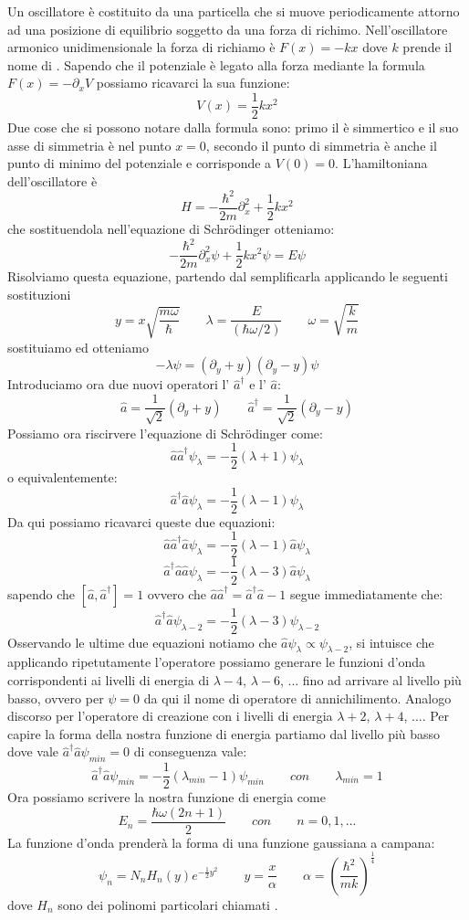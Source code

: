 Un oscillatore è costituito da una particella che si muove periodicamente attorno ad una posizione di equilibrio soggetto da una forza di richimo. Nell'oscillatore armonico unidimensionale la forza di richiamo è $F(x) = -kx$ dove $k$ prende il nome di . Sapendo che il potenziale è legato alla forza mediante la formula $F(x) = -\partial_x V$ possiamo ricavarci la sua funzione:
$$V(x) = \frac{1}{2}kx^2$$
Due cose che si possono notare dalla formula sono: primo il  è simmertico e il suo asse di simmetria è nel punto $x = 0$, secondo il punto di simmetria è anche il punto di minimo del potenziale e corrisponde a $V(0) = 0$.
L'hamiltoniana dell'oscillatore è
$$H = - \frac{\hbar^2}{2m} \partial_x^2 + \frac{1}{2}kx^2$$
che sostituendola nell'equazione di Schr\"odinger otteniamo:
$$- \frac{\hbar^2}{2m} \partial_x^2\psi + \frac{1}{2}kx^2\psi = E\psi$$
Risolviamo questa equazione, partendo dal semplificarla applicando le seguenti sostituzioni
$$y = x\sqrt{\frac{m\omega}{\hbar}} \qquad \lambda = \frac{E}{(\hbar \omega / 2)} \qquad \omega = \sqrt{\frac{k}{m}}$$
sostituiamo ed otteniamo
$$-\lambda \psi = (\partial_y + y)(\partial_y - y)\psi$$
Introduciamo ora due nuovi operatori l' $\hat{a}^{\dagger}$ e l' $\hat{a}$:
$$\hat{a} = \frac{1}{\sqrt{2}}(\partial_y + y) \qquad \hat{a}^{\dagger} = \frac{1}{\sqrt{2}}(\partial_y - y)$$
Possiamo ora riscirvere l'equazione di Schr\"odinger come:
$$\hat{a}\hat{a}^{\dagger}\psi_{\lambda} = -\frac{1}{2}(\lambda + 1) \psi_{\lambda}$$
o equivalentemente:
$$\hat{a}^{\dagger}\hat{a}\psi_{\lambda} = -\frac{1}{2}(\lambda - 1) \psi_{\lambda}$$
Da qui possiamo ricavarci queste due equazioni:
$$\hat{a}\hat{a}^{\dagger}\hat{a}\psi_{\lambda} = -\frac{1}{2}(\lambda - 1) \hat{a}\psi_{\lambda}$$
$$\hat{a}^{\dagger}\hat{a}\hat{a}\psi_{\lambda} = -\frac{1}{2}(\lambda - 3) \hat{a}\psi_{\lambda}$$
sapendo che $[\hat{a}, \hat{a}^{\dagger}] = 1$ ovvero che $\hat{a}\hat{a}^{\dagger} = \hat{a}^{\dagger}\hat{a} - 1$ segue immediatamente che:
$$\hat{a}^{\dagger}\hat{a}\psi_{\lambda-2} = -\frac{1}{2}(\lambda - 3) \psi_{\lambda-2}$$
Osservando le ultime due equazioni notiamo che $\hat{a}\psi_{\lambda} \propto \psi_{\lambda-2}$, si intuisce che applicando ripetutamente l'operatore possiamo generare le funzioni d'onda corrispondenti ai livelli di energia di $\lambda-4$, $ \lambda-6$, ... fino ad arrivare al livello più basso, ovvero per $\psi = 0$ da qui il nome di operatore di annichilimento.
Analogo discorso per l'operatore di creazione con i livelli di energia $\lambda+2$, $ \lambda+4$, .... Per capire la forma della nostra funzione di energia partiamo dal livello più basso dove vale $\hat{a}^{\dagger}\hat{a}\psi_{min} = 0$ di conseguenza vale:
$$\hat{a}^{\dagger}\hat{a}\psi_{min} = -\frac{1}{2}(\lambda_{min}-1)\psi_{min} \qquad con \qquad \lambda_{min} = 1$$
Ora possiamo scrivere la nostra funzione di energia come
$$E_n = \frac{\hbar\omega(2n+1)}{2} \qquad con \qquad n = 0, 1, ...$$
La funzione d'onda prenderà la forma di una funzione gaussiana a campana:
$$\psi_n = N_n H_n(y)e^{-\frac{1}{2}y^2} \qquad y = \frac{x}{\alpha} \qquad \alpha = \left(\frac{\hbar^2}{mk}\right)^{\frac{1}{4}}$$
dove $H_n$ sono dei polinomi particolari chiamati .
